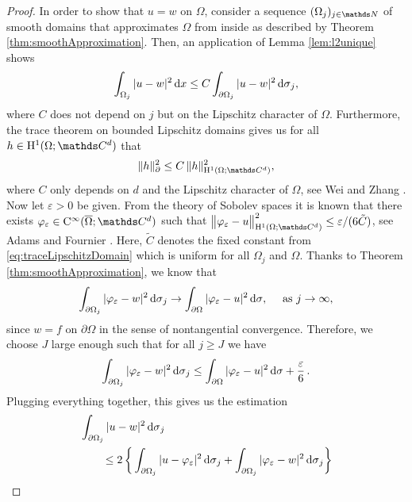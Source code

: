 \begin{proof}
  In order to show that $u = w$ on $\Omega$, consider a sequence $(\Omega_j)_{j \in \N}$ of smooth domains that approximates $\Omega$ from inside as described by Theorem \ref{thm:smoothApproximation}.
  Then, an application of Lemma \ref{lem:l2unique} shows
  \begin{align}
    \label{eq:reverseTraceUnique}
    \int_{\Omega_j} |u - w|^2 \, {\operatorname{d}\!{x}} \leq C \int_{\partial\Omega_j} |u - w|^2 \, {\operatorname{d}\!{\sigma}}_j,
  \end{align}
  where $C$ does not depend on $j$ but on the Lipschitz character of $\Omega$.
  Furthermore, the trace theorem on bounded Lipschitz domains gives us for all $h \in \HH^1(\Omega; \C^d)$ that
  \begin{align}
    \label{eq:traceLipschitzDomain}
     \|h\|_\partial^2 \leq C\, \|h\|_{\HH^1(\Omega; \C^d)}^2,
  \end{align}
  where $C$ only depends on $d$ and the Lipschitz character of $\Omega$, see Wei and Zhang \cite[Lem. 2.2]{weiZhang}.
  Now let $\varepsilon > 0$ be given. 
  From the theory of Sobolev spaces it is known that there exists $\varphi_\varepsilon \in \CC^\infty(\overline\Omega; \C^d)$ such that $\big\|\varphi_\varepsilon - u\big\|_{\HH^1(\Omega; \C^d)}^2 \leq {\varepsilon}/({6 \tilde C})$, see Adams and Fournier \cite[Thm. 3.18]{adams}.
  Here, $\tilde C$ denotes the fixed constant from \eqref{eq:traceLipschitzDomain} which is uniform for all $\Omega_j$ and $\Omega$.
  Thanks to Theorem \ref{thm:smoothApproximation}, we know that 
  \begin{align*}
    \int_{\partial\Omega_j} |\varphi_\varepsilon - w|^2 \, {\operatorname{d}\!{\sigma}}_j \to \int_{\partial\Omega} |\varphi_\varepsilon - u|^2 \, {\operatorname{d}\!{\sigma}}, \quad \text{ as } j \to \infty,
  \end{align*}
  since $w = f$ on $\partial\Omega$ in the sense of nontangential convergence.
  Therefore, we choose $J$ large enough such that for all $j \geq J$ we have
  \begin{align*}
    \int_{\partial\Omega_j} |\varphi_\varepsilon - w|^2 \, {\operatorname{d}\!{\sigma}}_j \leq \int_{\partial\Omega} |\varphi_\varepsilon - u|^2 \, {\operatorname{d}\!{\sigma}} + \frac{\varepsilon}{6}\,.
  \end{align*}
  Plugging everything together, this gives us the estimation
  \begin{align*}
    &\int_{\partial\Omega_j} |u - w|^2 \d\sigma_j  \\
    &\qquad\leq 2 \, \bigg\{ \int_{\partial\Omega_j} |u - \varphi_\varepsilon |^2 \d\sigma_j + \int_{\partial\Omega_j} |\varphi_\varepsilon - w|^2 \d\sigma_j \bigg\}

\end{align*}
\end{proof}
